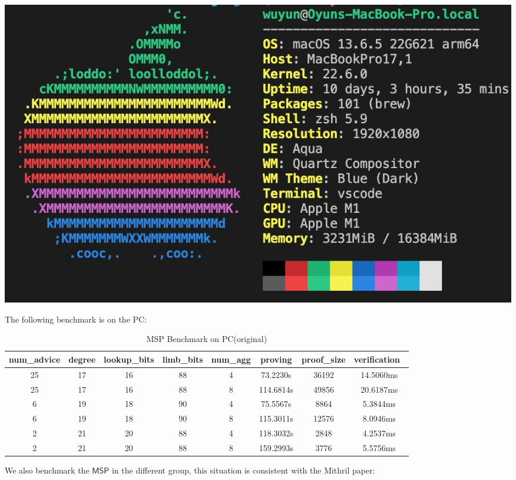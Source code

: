 \documentclass{article}
\begin{document}
\includegraphics[width=0.9\linewidth]{wuyun_mac.jpg}

The following benchmark is on the PC:\\
\begin{table}[ht]
    \centering
    \begin{tabular}{c|c|c|c|c|c|c|c}
        \toprule  
        num\_advice & degree & lookup\_bits & limb\_bits  & num\_agg  & proving & proof\_size & verification\ \\
        \midrule
        25 & 17 & 16 & 88  & 4   & 73.2230s   & 36192 & 14.5060ms \\
        25 & 17 & 16 & 88  & 8  & 114.6814s  & 49856 & 20.6187ms \\
        6  & 19 & 18 & 90 & 4   & 75.5567s   & 8864  & 5.3844ms  \\
        6  & 19 & 18 & 90  & 8  & 115.3011s    & 12576 & 8.0946ms  \\
        2  & 21 & 20 & 88  & 4   & 118.3032s  & 2848  & 4.2537ms  \\
        2  & 21 & 20 & 88  & 8  & 159.2993s  & 3776  & 5.5756ms  \\
        \bottomrule
    \end{tabular}
    \caption{MSP Benchmark on PC(original)}
    \label{tab:data_table}
\end{table}




We also benchmark the $\mathsf{MSP}$ in the different group, this situation is consistent with the Mithril paper:
\end{document}
